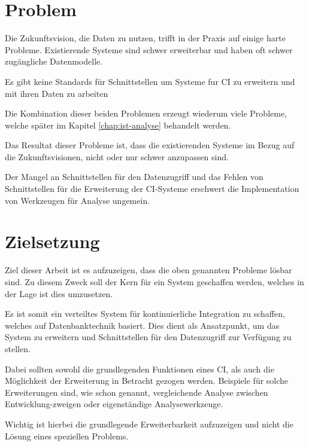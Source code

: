 


\section{Problem}

Die Zukunftsvision, die Daten zu nutzen,
trifft in der Praxis auf einige harte Probleme.
Existierende Systeme sind schwer erweiterbar und haben oft schwer zugängliche Datenmodelle.

Es gibt keine Standards für Schnittstellen um Systeme fur \ac{CI} zu erweitern und mit ihren Daten zu arbeiten

Die Kombination dieser beiden Problemen erzeugt wiederum viele Probleme,
welche später im Kapitel \ref{chap:ist-analyse} behandelt werden.

Das Resultat dieser Probleme ist, dass die existierenden Systeme im Bezug auf die Zukunftsvisionen,
nicht oder nur schwer anzupassen sind.

Der Mangel an Schnittstellen für den Datenzugriff und
das Fehlen von Schnittstellen für die Erweiterung der CI-Systeme
erschwert die Implementation von Werkzeugen für Analyse ungemein.


\section{Zielsetzung}
Ziel dieser Arbeit ist es aufzuzeigen, dass die oben genannten Probleme lösbar sind.
Zu diesem Zweck soll der Kern für ein System geschaffen werden,
welches in der Lage ist dies umzusetzen.

Es ist somit ein verteiltes System für kontinuierliche Integration zu schaffen,
welches auf Datenbanktechnik basiert.
Dies dient als Ansatzpunkt, um das System zu erweitern und
Schnittstellen für den Datenzugriff zur Verfügung zu stellen.

Dabei sollten sowohl die grundlegenden Funktionen eines CI,
als auch die Möglichkeit der Erweiterung in Betracht gezogen werden.
Beispiele für solche Erweiterungen sind, wie schon genannt,
vergleichende Analyse zwischen Entwicklung-zweigen oder eigenständige Analysewerkzeuge.

Wichtig ist hierbei die grundlegende Erweiterbarkeit aufzuzeigen
und nicht die Lösung eines speziellen Problems.


